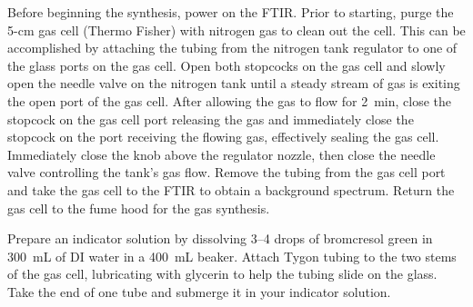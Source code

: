 \documentclass[nobib,nofonts,nols,nohyper]{tufte-handout}
\begin{document}
Before beginning the synthesis, power on the FTIR. 
Prior to starting, purge the 5-cm gas cell (Thermo Fisher) with nitrogen gas to clean out the cell.
This can be accomplished by attaching the tubing from the nitrogen tank regulator to one of the glass ports on the gas cell. 
Open both stopcocks on the gas cell and slowly open the needle valve on the nitrogen tank until a steady stream of gas is exiting the open port of the gas cell. 
After allowing the gas to flow for \SI{2}{\minute}, close the stopcock on the gas cell port releasing the gas and immediately close the stopcock on the port receiving the flowing gas, effectively sealing the gas cell. 
Immediately close the knob above the regulator nozzle, then close the needle valve controlling the tank's gas flow. 
Remove the tubing from the gas cell port and take the gas cell to the FTIR to obtain a background spectrum. 
Return the gas cell to the fume hood for the gas synthesis. 

Prepare an indicator solution by dissolving \numrange{3}{4} drops of bromcresol green in \SI{300}{\mL} of DI water in a \SI{400}{\mL} beaker. 
Attach Tygon tubing to the two stems of the gas cell, lubricating with glycerin to help the tubing slide on the glass. 
Take the end of one tube and submerge it in your indicator solution. 
\end{document}
